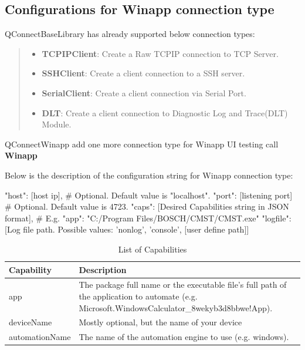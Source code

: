 \hypertarget{connect}{%
\subsection{\texorpdfstring{\textbf{Configurations for Winapp connection type}}{connect}}\label{connect}}

QConnectBaseLibrary has already
supported below connection types:

\begin{quote}
\begin{itemize}
\tightlist
\item
  \textbf{TCPIPClient}: Create a Raw TCPIP connection to TCP Server.
\item
  \textbf{SSHClient}: Create a client connection to a SSH server.
\item
  \textbf{SerialClient}: Create a client connection via Serial Port.
\item
  \textbf{DLT}: Create a client connection to Diagnostic Log and Trace(DLT) Module.
\end{itemize}
\end{quote}

QConnectWinapp add one more connection type for Winapp UI testing call \textbf{Winapp}


Below is the description of the configuration string for Winapp connection type:


\begin{robotcode}
{
    "host": [host ip],     # Optional. Default value is "localhost".
    "port": [listening port]  # Optional. Default value is 4723.
    "caps": [Desired Capabilities string in JSON format],  # E.g. { "app": "C:/Program Files/BOSCH/CMST/CMST.exe"}
    "logfile": [Log file path. Possible values: 'nonlog', 'console', [user define path]]
}
\end{robotcode}

\begin{table}[h]
\centering
\caption{List of Capabilities}
\begin{tabular}{|p{3cm}|p{9cm}|}
\hline
\textbf{Capability} & \textbf{Description} \\
\hline
app & The package full name or the executable file's full path of the application to automate (e.g. Microsoft.WindowsCalculator\_8wekyb3d8bbwe!App). \\
\hline
deviceName & Mostly optional, but the name of your device \\
\hline
automationName & The name of the automation engine to use (e.g. windows). \\
\hline
\end{tabular}
\end{table}

